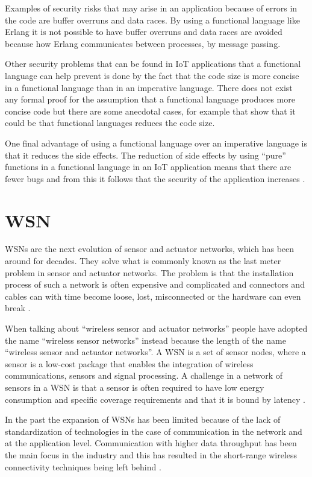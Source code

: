 Examples of security risks that may arise in an application because of errors in the code are buffer overruns and data races. By using a functional language like Erlang it is not possible to have buffer overruns and data races are avoided because how Erlang communicates between processes, by message passing. 

Other security problems that can be found in IoT applications that a functional language can help prevent is done by the fact that the code size is more concise in a functional language than in an imperative language. There does not exist any formal proof for the assumption that a functional language produces more concise code but there are some anecdotal cases, for example \citet{carmack2013} that show that it could be that functional languages reduces the code size.

One final advantage of using a functional language over an imperative language is that it reduces the side effects. The reduction of side effects by using “pure” functions in a functional language in an IoT application means that there are fewer bugs and from this it follows that the security of the application increases \citep{haenisch2016case}.

\section{WSN}
WSNs are the next evolution of sensor and actuator networks, which has been around for decades. They solve what is commonly known as the last meter problem in sensor and actuator networks. The problem is that the installation process of such a network is often expensive and complicated and connectors and cables can with time become loose, lost, misconnected or the hardware can even break \citep{yang2014internet}. 

When talking about “wireless sensor and actuator networks” people have adopted the name “wireless sensor networks” instead because the length of the name “wireless sensor and actuator networks”. A WSN is a set of sensor nodes, where a sensor is a low-cost package that enables the integration of wireless communications, sensors and signal processing. A challenge in a network of sensors in a WSN is that a sensor is often required to have low energy consumption and specific coverage requirements and that it is bound by latency \citep{essameldindevice, yang2014internet}.

In the past the expansion of WSNs has been limited because of the lack of standardization of technologies in the case of communication in the network and at the application level. Communication with higher data throughput has been the main focus in the industry and this has resulted in the short-range wireless connectivity techniques being left behind \citep{gutierrez2004low}.


